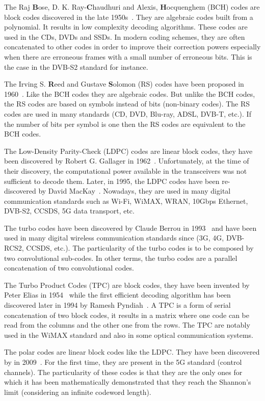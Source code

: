 The Raj \textbf{B}ose, D. K. Ray-\textbf{C}haudhuri and Alexis,
\textbf{H}ocquenghem (BCH) codes are block codes discovered in the late
1950s~\cite{Hocquenghem1959,Bose1960}. They are algebraic codes built from a
polynomial. It results in low complexity decoding algorithms. These codes are
used in the CDs, DVDs and SSDs. In modern coding schemes, they are often
concatenated to other codes in order to improve their correction powers
especially when there are erroneous frames with a small number of erroneous
bits. This is the case in the DVB-S2 standard for instance.

The Irving S. \textbf{R}eed and Gustave \textbf{S}olomon (RS) codes have been
proposed in 1960~\cite{Reed1960}. Like the BCH codes they are algebraic codes.
But unlike the BCH codes, the RS codes are based on symbols instead of bits
(non-binary codes). The RS codes are used in many standards (CD, DVD, Blu-ray,
ADSL, DVB-T, etc.). If the number of bits per symbol is one then the RS codes
are equivalent to the BCH codes.

The Low-Density Parity-Check (LDPC) codes are linear block codes, they have been
discovered by Robert G. Gallager in 1962~\cite{Gallager1962}. Unfortunately, at
the time of their discovery, the computational power available in the
transceivers was not sufficient to decode them. Later, in 1995, the LDPC codes
have been re-discovered by David MacKay~\cite{MacKay1995}. Nowadays, they are
used in many digital communication standards such as Wi-Fi, WiMAX, WRAN, 10Gbps
Ethernet, DVB-S2, CCSDS, 5G data transport, etc.

The turbo codes have been discovered by Claude Berrou in 1993~\cite{Berrou1993}
and have been used in many digital wireless communication standards since (3G,
4G, DVB-RCS2, CCSDS, etc.). The particularity of the turbo codes is to be
composed by two convolutional sub-codes. In other terms, the turbo codes are a
parallel concatenation of two convolutional codes.

The Turbo Product Codes (TPC) are block codes, they have been invented by Peter
Elias in 1954~\cite{Elias1954} while the first efficient decoding algorithm has
been discovered later in 1994 by Ramesh Pyndiah~\cite{Pyndiah1994}. A TPC is a
form of serial concatenation of two block codes, it results in a matrix where
one code can be read from the columns and the other one from the rows. The TPC
are notably used in the WiMAX standard and also in some optical communication
systems.

The polar codes are linear block codes like the LDPC. They have been discovered
by \Arikan in 2009~\cite{Arikan2009}. For the first time, they are present in
the 5G standard (control channels). The particularity of these codes is that
they are the only ones for which it has been mathematically demonstrated that
they reach the Shannon's limit (considering an infinite codeword length).


